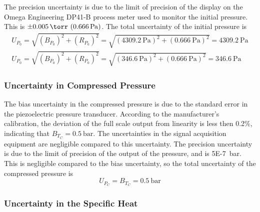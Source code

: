 \documentclass[12pt, letterpaper]{article}
\begin{document}
The precision uncertainty is due to the limit of precision of the display
on the Omega Engineering DP41-B process meter used to monitor the initial
pressure. This is $\pm\SI{0.005}{\torr} \ (\SI{0.666}{\pascal})$. The total
uncertainty of the initial pressure is
%
\begin{subequations}
\begin{align}
U_{P_0} = \sqrt{\left(B_{P_0}\right)^2 + \left(R_{P_0}\right)^2} = \sqrt{\left(\SI{4309.2}{\pascal}\right)^2 + \left(\SI{0.666}{\pascal}\right)^2} = \SI{4309.2}{\pascal} \\
U_{P_0} = \sqrt{\left(B_{P_0}\right)^2 + \left(R_{P_0}\right)^2} = \sqrt{\left(\SI{346.6}{\pascal}\right)^2 + \left(\SI{0.666}{\pascal}\right)^2} = \SI{346.6}{\pascal}
\end{align}
\end{subequations}

\subsubsection{Uncertainty in Compressed Pressure}

The bias uncertainty in the compressed pressure is due to the standard
error in the piezoelectric pressure transducer. According to the
manufacturer's calibration, the deviation of the full scale output from
linearity is less then 0.2\%, indicating that $B_{T_C}=\SI{0.5}{\bar}$.
The uncertainties in the signal acquisition equipment are negligible
compared to this uncertainty. The precision uncertainty is due to the limit
of precision of the output of the pressure, and is \SI{5E-7}{\bar}. This
is negligible compared to the bias uncertainty, so the total uncertainty
of the compressed pressure is
%
\begin{equation}
U_{P_C} = B_{T_C} = \SI{0.5}{\bar}
\end{equation}

\subsubsection{Uncertainty in the Specific Heat}
\label{sec:unc-cp}
\end{document}
